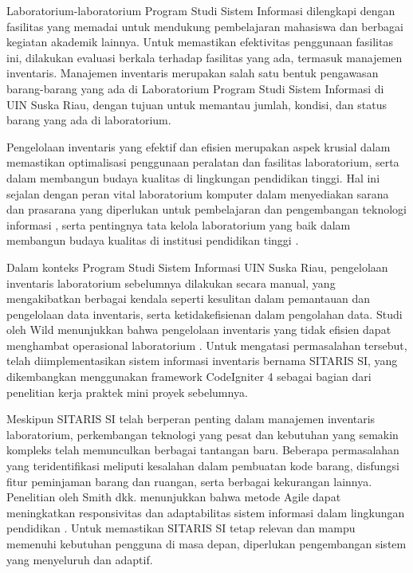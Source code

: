 Laboratorium-laboratorium Program Studi Sistem Informasi dilengkapi dengan fasilitas yang memadai untuk mendukung pembelajaran mahasiswa dan berbagai kegiatan akademik lainnya. Untuk memastikan efektivitas penggunaan fasilitas ini, dilakukan evaluasi berkala terhadap fasilitas yang ada, termasuk manajemen inventaris. Manajemen inventaris merupakan salah satu bentuk pengawasan barang-barang yang ada di Laboratorium Program Studi Sistem Informasi di UIN Suska Riau, dengan tujuan untuk memantau jumlah, kondisi, dan status barang yang ada di laboratorium.

Pengelolaan inventaris yang efektif dan efisien merupakan aspek krusial dalam memastikan optimalisasi penggunaan peralatan dan fasilitas laboratorium, serta dalam membangun budaya kualitas di lingkungan pendidikan tinggi. Hal ini sejalan dengan peran vital laboratorium komputer dalam menyediakan sarana dan prasarana yang diperlukan untuk pembelajaran dan pengembangan teknologi informasi \cite{stamatelos2009role}, serta pentingnya tata kelola laboratorium yang baik dalam membangun budaya kualitas di institusi pendidikan tinggi \cite{abrantes2020governance}.

Dalam konteks Program Studi Sistem Informasi UIN Suska Riau, pengelolaan inventaris laboratorium sebelumnya dilakukan secara manual, yang mengakibatkan berbagai kendala seperti kesulitan dalam pemantauan dan pengelolaan data inventaris, serta ketidakefisienan dalam pengolahan data. Studi oleh Wild \citeyear{smith2021agile} menunjukkan bahwa pengelolaan inventaris yang tidak efisien dapat menghambat operasional laboratorium \cite{wild2017best}. Untuk mengatasi permasalahan tersebut, telah diimplementasikan sistem informasi inventaris bernama SITARIS SI, yang dikembangkan menggunakan framework CodeIgniter 4 sebagai bagian dari penelitian kerja praktek mini proyek sebelumnya.

Meskipun SITARIS SI telah berperan penting dalam manajemen inventaris laboratorium, perkembangan teknologi yang pesat dan kebutuhan yang semakin kompleks telah memunculkan berbagai tantangan baru. Beberapa permasalahan yang teridentifikasi meliputi kesalahan dalam pembuatan kode barang, disfungsi fitur peminjaman barang dan ruangan, serta berbagai kekurangan lainnya. Penelitian oleh Smith dkk. \citeyear{smith2021agile} menunjukkan bahwa metode Agile dapat meningkatkan responsivitas dan adaptabilitas sistem informasi dalam lingkungan pendidikan \cite{smith2021agile}. Untuk memastikan SITARIS SI tetap relevan dan mampu memenuhi kebutuhan pengguna di masa depan, diperlukan pengembangan sistem yang menyeluruh dan adaptif.

